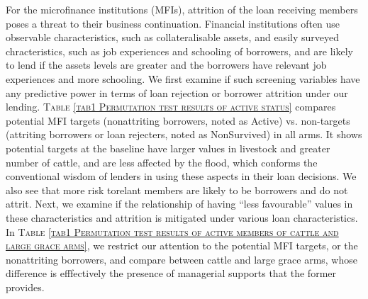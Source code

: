 	For the microfinance institutions (MFIs), attrition of the loan receiving members poses a threat to their business continuation. Financial institutions often use observable characteristics, such as collateralisable assets, and easily surveyed chracteristics, such as job experiences and schooling of borrowers, and are likely to lend if the assets levels are greater and the borrowers have relevant job experiences and more schooling. We first examine if such screening variables have any predictive power in terms of loan rejection or borrower attrition under our lending. \textsc{\normalsize Table \ref{tab1 Permutation test results of active status}} compares potential MFI targets (nonattriting borrowers, noted as \textsf{Active}) vs. non-targets (attriting borrowers or loan rejecters, noted as \textsf{NonSurvived}) in all arms. It shows potential targets at the baseline have larger values in livestock and greater number of cattle, and are less affected by the flood, which conforms the conventional wisdom of lenders in using these aspects in their loan decisions. We also see that more risk torelant members are likely to be borrowers and do not attrit. Next, we examine if the relationship of having ``less favourable'' values in these characteristics and attrition is mitigated under various loan characteristics. In \textsc{\normalsize Table \ref{tab1 Permutation test results of active members of cattle and large grace arms}}, we restrict our attention to the potential MFI targets, or the nonattriting borrowers, and compare between \textsf{cattle} and \textsf{large grace} arms, whose difference is efffectively the presence of managerial supports that the former provides. \label{PageOfAttrition}%
